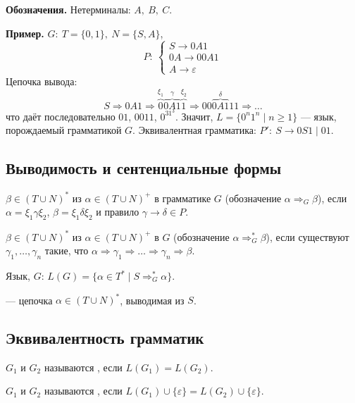 \documentclass[11pt,a4paper]{article}
\newcommand{\rul}{\rightarrow}
\begin{document}
\textbf{Обозначения.} Нетерминалы: $A,\ B,\ C$.

\textbf{Пример.} $G:\ T=\{0,1\},\ N=\{S,A\}$,
\[
P:\ \begin{cases}S\rul0A1\\ 0A\rul00A1\\ A\rul\varepsilon\end{cases}
\]
Цепочка вывода:
\[
S\Rightarrow0A1\Rightarrow\overbrace{0}^{\xi_1}\overbrace{0A1}^{\gamma}\overbrace{1}^{\xi_2}\Rightarrow00\overbrace{0A1}^{\delta}11\Rightarrow\dots
\]
что даёт последовательно $01$, $0011$, $0^31^3$. Значит, $L=\{0^n1^n\mid n\ge1\}$ — язык, порождаемый грамматикой $G$.
Эквивалентная грамматика: $P':\ S\rul0S1\mid01$.

\subsection{Выводимость и сентенциальные формы}

\begin{opr}
$\beta\in(T\cup N)^*$  из $\alpha\in(T\cup N)^+$ в грамматике $G$ (обозначение $\alpha\Rightarrow_G\beta$),
если $\alpha=\xi_1\gamma\xi_2$, $\beta=\xi_1\delta\xi_2$ и правило $\gamma\rul\delta\in P$.
\end{opr}
\begin{opr}
$\beta\in(T\cup N)^*$  из $\alpha\in(T\cup N)^+$ в $G$ (обозначение $\alpha\Rightarrow^*_G\beta$), если существуют
$\gamma_1,\dots,\gamma_n$ такие, что $\alpha\Rightarrow\gamma_1\Rightarrow\dots\Rightarrow\gamma_n\Rightarrow\beta$.
\end{opr}
\begin{opr}
Язык,  $G$: $L(G)=\{\alpha\in T^*\mid S\Rightarrow^*_G\alpha\}$.
\end{opr}
\begin{opr}
 — цепочка $\alpha\in(T\cup N)^*$, выводимая из $S$.
\end{opr}

\subsection{Эквивалентность грамматик}

\begin{opr}
$G_1$ и $G_2$ называются , если $L(G_1)=L(G_2)$.
\end{opr}
\begin{opr}
$G_1$ и $G_2$ называются , если $L(G_1)\cup\{\varepsilon\}=L(G_2)\cup\{\varepsilon\}$.
\end{opr}
\end{document}
